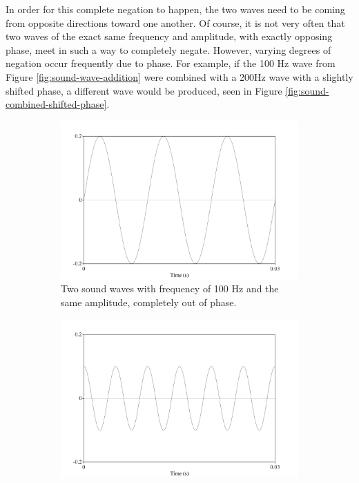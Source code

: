 \documentclass[dissertation,copyright]{uathesis}
\begin{document}
In order for this complete negation to happen, the two waves need to be coming from opposite directions toward one another.  Of course, it is not very often that two waves of the exact same frequency and amplitude, with exactly opposing phase, meet in such a way to completely negate.  However, varying degrees of negation occur frequently due to phase.  For example, if the 100 Hz wave from Figure \ref{fig:sound-wave-addition} were combined with a 200Hz wave with a slightly shifted phase, a different wave would be produced, seen in Figure \ref{fig:sound-combined-shifted-phase}.  

\begin{figure}[h!]
\begin{subfigure}{0.5\textwidth}
  \includegraphics[width=\textwidth]{figure/basic-sound-wave.png}
  \caption{Two sound waves with frequency of 100 Hz and the same amplitude, completely out of phase.}
  \label{fig:wave-out-of-phase}
\end{subfigure}
\qquad
\begin{subfigure}{0.5\textwidth}
  \includegraphics[width=\textwidth]{figure/sound-wave-addition-200hz-shifted.png}

\end{subfigure}
\end{figure}
\end{document}
